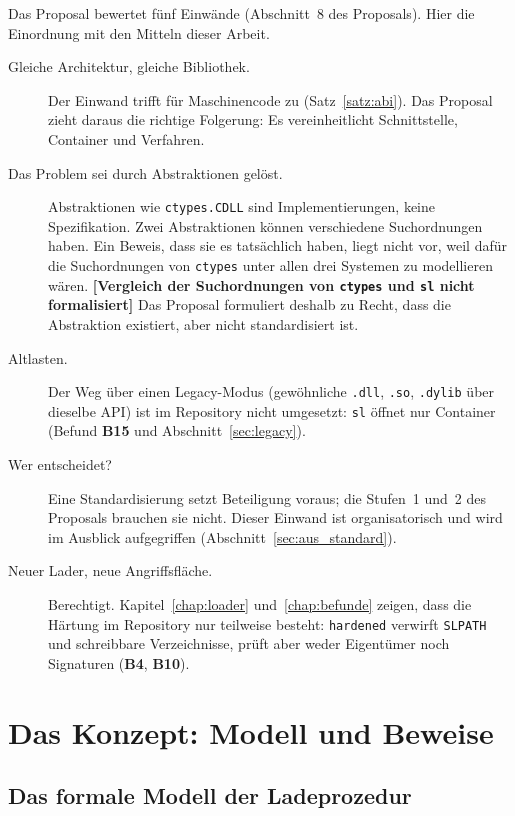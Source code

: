 \documentclass[a4paper,12pt,twoside]{report}
\DeclareRobustCommand{\_}{\ifmmode\mbox{\textunderscore}\else\textunderscore\allowbreak{}\fi}
\theoremstyle{definition}
\newcommand{\offen}[1]{\textcolor{accentred}{\textbf{[#1]}}}
\newcommand{\Bf}[1]{\textbf{B#1}}
\begin{document}
Das Proposal bewertet fünf Einwände (Abschnitt~8 des Proposals). Hier die Einordnung mit den Mitteln dieser Arbeit.

\begin{description}
	\item[Gleiche Architektur, gleiche Bibliothek.] Der Einwand trifft für Maschinencode zu (Satz~\ref{satz:abi}). Das Proposal zieht daraus die richtige Folgerung: Es vereinheitlicht Schnittstelle, Container und Verfahren.
	\item[Das Problem sei durch Abstraktionen gelöst.] Abstraktionen wie \texttt{ctypes.CDLL} sind Implementierungen, keine Spezifikation. Zwei Abstraktionen können verschiedene Suchordnungen haben. Ein Beweis, dass sie es tatsächlich haben, liegt nicht vor, weil dafür die Suchordnungen von \texttt{ctypes} unter allen drei Systemen zu modellieren wären. \offen{Vergleich der Suchordnungen von \texttt{ctypes} und \texttt{sl} nicht formalisiert} Das Proposal formuliert deshalb zu Recht, dass die Abstraktion existiert, aber nicht standardisiert ist.
	\item[Altlasten.] Der Weg über einen Legacy-Modus (gewöhnliche \texttt{.dll}, \texttt{.so}, \texttt{.dylib} über dieselbe API) ist im Repository nicht umgesetzt: \texttt{sl} öffnet nur Container (Befund \Bf{15} und Abschnitt~\ref{sec:legacy}).
	\item[Wer entscheidet?] Eine Standardisierung setzt Beteiligung voraus; die Stufen~1 und~2 des Proposals brauchen sie nicht. Dieser Einwand ist organisatorisch und wird im Ausblick aufgegriffen (Abschnitt~\ref{sec:aus_standard}).
	\item[Neuer Lader, neue Angriffsfläche.] Berechtigt. Kapitel~\ref{chap:loader} und~\ref{chap:befunde} zeigen, dass die Härtung im Repository nur teilweise besteht: \texttt{hardened} verwirft \texttt{SL\_PATH} und schreibbare Verzeichnisse, prüft aber weder Eigentümer noch Signaturen (\Bf{4}, \Bf{10}).
\end{description}


\part{Das Konzept: Modell und Beweise}

\chapter{Das formale Modell der Ladeprozedur}
\label{chap:modell}
\end{document}
